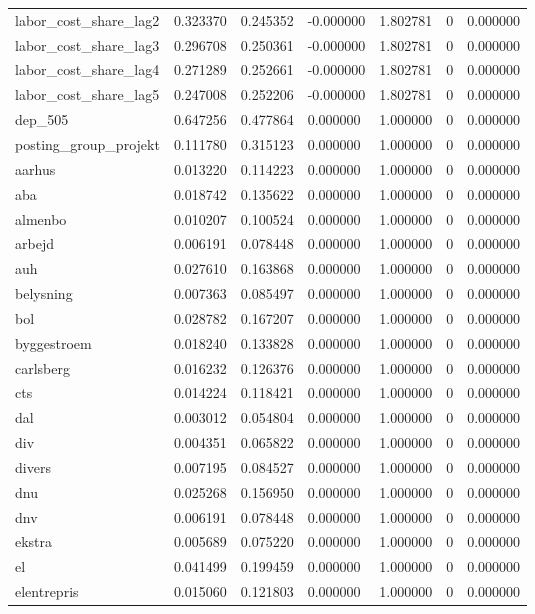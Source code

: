 \begin{landscape}
\begin{longtable}[h!]{lrrllrr}
labor_cost_share_lag2 & 0.323370 & 0.245352 & -0.000000 & 1.802781 & 0 & 0.000000 \\
labor_cost_share_lag3 & 0.296708 & 0.250361 & -0.000000 & 1.802781 & 0 & 0.000000 \\
labor_cost_share_lag4 & 0.271289 & 0.252661 & -0.000000 & 1.802781 & 0 & 0.000000 \\
labor_cost_share_lag5 & 0.247008 & 0.252206 & -0.000000 & 1.802781 & 0 & 0.000000 \\
dep_505 & 0.647256 & 0.477864 & 0.000000 & 1.000000 & 0 & 0.000000 \\
posting_group_projekt & 0.111780 & 0.315123 & 0.000000 & 1.000000 & 0 & 0.000000 \\
aarhus & 0.013220 & 0.114223 & 0.000000 & 1.000000 & 0 & 0.000000 \\
aba & 0.018742 & 0.135622 & 0.000000 & 1.000000 & 0 & 0.000000 \\
almenbo & 0.010207 & 0.100524 & 0.000000 & 1.000000 & 0 & 0.000000 \\
arbejd & 0.006191 & 0.078448 & 0.000000 & 1.000000 & 0 & 0.000000 \\
auh & 0.027610 & 0.163868 & 0.000000 & 1.000000 & 0 & 0.000000 \\
belysning & 0.007363 & 0.085497 & 0.000000 & 1.000000 & 0 & 0.000000 \\
bol & 0.028782 & 0.167207 & 0.000000 & 1.000000 & 0 & 0.000000 \\
byggestroem & 0.018240 & 0.133828 & 0.000000 & 1.000000 & 0 & 0.000000 \\
carlsberg & 0.016232 & 0.126376 & 0.000000 & 1.000000 & 0 & 0.000000 \\
cts & 0.014224 & 0.118421 & 0.000000 & 1.000000 & 0 & 0.000000 \\
dal & 0.003012 & 0.054804 & 0.000000 & 1.000000 & 0 & 0.000000 \\
div & 0.004351 & 0.065822 & 0.000000 & 1.000000 & 0 & 0.000000 \\
divers & 0.007195 & 0.084527 & 0.000000 & 1.000000 & 0 & 0.000000 \\
dnu & 0.025268 & 0.156950 & 0.000000 & 1.000000 & 0 & 0.000000 \\
dnv & 0.006191 & 0.078448 & 0.000000 & 1.000000 & 0 & 0.000000 \\
ekstra & 0.005689 & 0.075220 & 0.000000 & 1.000000 & 0 & 0.000000 \\
el & 0.041499 & 0.199459 & 0.000000 & 1.000000 & 0 & 0.000000 \\
elentrepris & 0.015060 & 0.121803 & 0.000000 & 1.000000 & 0 & 0.000000 \\

\end{longtable}
\end{landscape}
